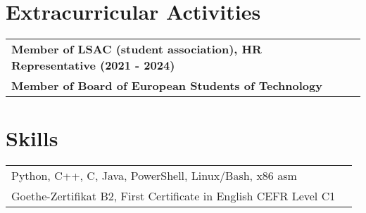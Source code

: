 \documentclass[a4paper,12pt]{article}
\begin{document}
\section{Extracurricular Activities}
\begin{tabularx}{\linewidth}{ @{}l r@{} }
\textbf{Member of LSAC (student association), HR Representative (2021 - 2024)} \\
\textbf{Member of Board of European Students of Technology} \\

\end{tabularx}
\section{Skills}
\begin{tabularx}{\linewidth}{@{}l X@{}}
Python, C++, C, Java, PowerShell, Linux/Bash, x86 asm
\\ Goethe-Zertifikat B2, First Certificate in English CEFR Level C1
\end{tabularx}
\end{document}
